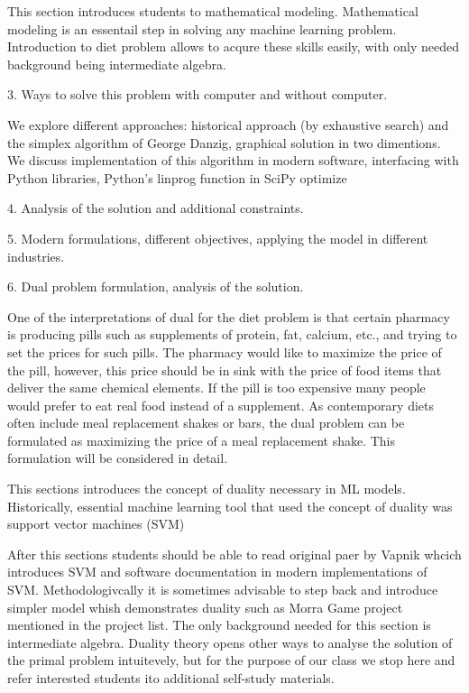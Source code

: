 {{{This section introduces students to mathematical modeling. Mathematical modeling is an essentail step in solving any machine learning problem. Introduction to diet problem allows to acqure these  skills easily, with only needed background being intermediate algebra.


3. Ways to solve this problem with computer and without computer.

We explore different approaches: historical approach (by exhaustive search) and the simplex algorithm of George Danzig, graphical solution in two dimentions. We discuss implementation of this algorithm in modern software, interfacing with Python libraries, Python's linprog function in SciPy optimize

4. Analysis of the solution and additional constraints.

5. Modern formulations, different objectives, applying the model in different industries.

6. Dual problem formulation, analysis of the solution.

One of the interpretations of dual for the diet problem is that certain pharmacy is producing pills such as supplements of protein, fat, calcium, etc., and trying to set the prices for such pills. The pharmacy would like to maximize the price of the pill, however, this price should be in sink with the price of food items that deliver the same chemical elements. If the pill is too expensive many people would prefer to eat real food instead of a supplement. As contemporary diets often include meal replacement shakes or bars, the dual problem can be formulated as maximizing the price of a meal replacement shake. This formulation will be considered in detail. 

This sections introduces the concept of duality necessary in ML models. Historically, essential machine learning tool that used the concept of duality was support vector machines (SVM)

After this sections students should be able to read original paer by Vapnik whcich introduces SVM and software documentation in modern implementations of SVM. Methodologivcally it is sometimes advisable to step back and introduce simpler model whish demonstrates duality such as Morra Game project mentioned in the project list. The only background needed for this section is intermediate algebra. Duality theory opens other ways to analyse the solution of the primal problem intuitevely, but for the purpose of our class we stop here and refer interested students ito additional self-study materials.

}}}
